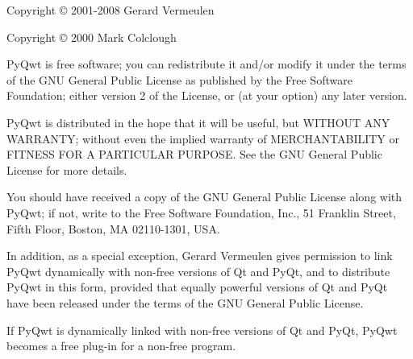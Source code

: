 Copyright \copyright{} 2001-2008 Gerard Vermeulen

Copyright \copyright{} 2000 Mark Colclough

PyQwt is free software; you can redistribute it and/or modify
it under the terms of the GNU General Public License as published by
the Free Software Foundation; either version 2 of the License, or
(at your option) any later version.

PyQwt is distributed in the hope that it will be useful,
but WITHOUT ANY WARRANTY; without even the implied warranty of
MERCHANTABILITY or FITNESS FOR A PARTICULAR PURPOSE.  See the
GNU General Public License for more details.

You should have received a copy of the GNU General Public License along
with PyQwt; if not, write to the Free Software Foundation, Inc.,
51 Franklin Street, Fifth Floor, Boston, MA  02110-1301, USA.

In addition, as a special exception, Gerard Vermeulen gives permission
to link PyQwt dynamically with non-free versions of Qt and PyQt,
and to distribute PyQwt in this form, provided that equally powerful
versions of Qt and PyQt have been released under the terms of the GNU
General Public License.

If PyQwt is dynamically linked with non-free versions of Qt and PyQt,
PyQwt becomes a free plug-in for a non-free program.



